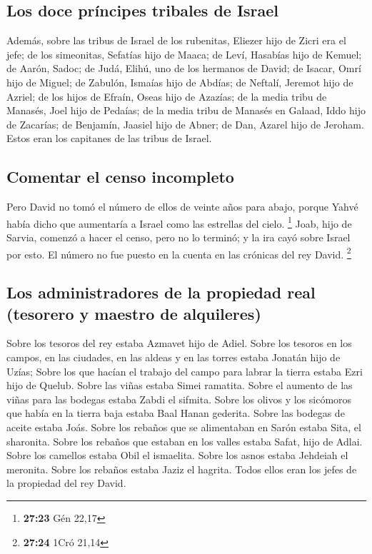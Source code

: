 \hypertarget{los-doce-pruxedncipes-tribales-de-israel}{%
\subsection{Los doce príncipes tribales de
Israel}\label{los-doce-pruxedncipes-tribales-de-israel}}

 Además, sobre las tribus de Israel de los rubenitas,
Eliezer hijo de Zicri era el jefe; de los simeonitas, Sefatías hijo de
Maaca;  de Leví, Hasabías hijo de Kemuel; de Aarón,
Sadoc;  de Judá, Elihú, uno de los hermanos de David; de
Isacar, Omrí hijo de Miguel;  de Zabulón, Ismaías hijo de
Abdías; de Neftalí, Jeremot hijo de Azriel;  de los hijos
de Efraín, Oseas hijo de Azazías; de la media tribu de Manasés, Joel
hijo de Pedaías;  de la media tribu de Manasés en Galaad,
Iddo hijo de Zacarías; de Benjamín, Jaasiel hijo de Abner;
 de Dan, Azarel hijo de Jeroham. Estos eran los capitanes
de las tribus de Israel.

\hypertarget{comentar-el-censo-incompleto}{%
\subsection{Comentar el censo
incompleto}\label{comentar-el-censo-incompleto}}

 Pero David no tomó el número de ellos de veinte años
para abajo, porque Yahvé había dicho que aumentaría a Israel como las
estrellas del cielo. \footnote{\textbf{27:23} Gén 22,17} 
Joab, hijo de Sarvia, comenzó a hacer el censo, pero no lo terminó; y la
ira cayó sobre Israel por esto. El número no fue puesto en la cuenta en
las crónicas del rey David. \footnote{\textbf{27:24} 1Cró 21,14}

\hypertarget{los-administradores-de-la-propiedad-real-tesorero-y-maestro-de-alquileres}{%
\subsection{Los administradores de la propiedad real (tesorero y maestro
de
alquileres)}\label{los-administradores-de-la-propiedad-real-tesorero-y-maestro-de-alquileres}}

 Sobre los tesoros del rey estaba Azmavet hijo de Adiel.
Sobre los tesoros en los campos, en las ciudades, en las aldeas y en las
torres estaba Jonatán hijo de Uzías;  Sobre los que
hacían el trabajo del campo para labrar la tierra estaba Ezri hijo de
Quelub.  Sobre las viñas estaba Simei ramatita. Sobre el
aumento de las viñas para las bodegas estaba Zabdi el sifmita.
 Sobre los olivos y los sicómoros que había en la tierra
baja estaba Baal Hanan gederita. Sobre las bodegas de aceite estaba
Joás.  Sobre los rebaños que se alimentaban en Sarón
estaba Sita, el sharonita. Sobre los rebaños que estaban en los valles
estaba Safat, hijo de Adlai.  Sobre los camellos estaba
Obil el ismaelita. Sobre los asnos estaba Jehdeiah el meronita. Sobre
los rebaños estaba Jaziz el hagrita.  Todos ellos eran
los jefes de la propiedad del rey David.

